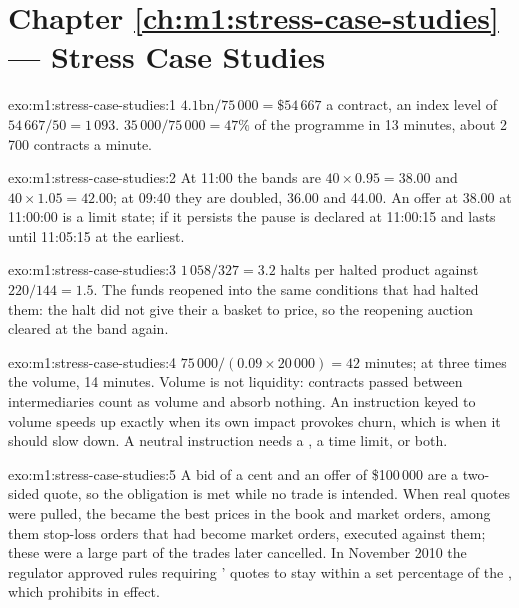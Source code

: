 \section*{Chapter \ref{ch:m1:stress-case-studies} --- Stress Case Studies}

\begin{solution}{exo:m1:stress-case-studies:1}
$4.1\text{bn}/75\,000 = \$54\,667$ a contract, an index level of $54\,667/50 =
1\,093$. $35\,000/75\,000 = 47\%$ of the programme in 13 minutes, about 2\,700
contracts a minute.
\end{solution}

\begin{solution}{exo:m1:stress-case-studies:2}
At 11:00 the bands are $40 \times 0.95 = 38.00$ and $40 \times 1.05 = 42.00$; at
09:40 they are doubled, 36.00 and 44.00. An offer at 38.00 at 11:00:00 is a
limit state; if it persists the pause is declared at 11:00:15 and lasts until
11:05:15 at the earliest.
\end{solution}

\begin{solution}{exo:m1:stress-case-studies:3}
$1\,058/327 = 3.2$ halts per halted product against $220/144 = 1.5$. The funds
reopened into the same conditions that had halted them: the halt did not give
their  a basket to price, so the reopening auction cleared at
the band again.
\end{solution}

\begin{solution}{exo:m1:stress-case-studies:4}
$75\,000/(0.09 \times 20\,000) = 42$ minutes; at three times the volume, 14
minutes. Volume is not liquidity: contracts passed between intermediaries
count as volume and absorb nothing. An instruction keyed to volume speeds up
exactly when its own impact provokes churn, which is when it should slow
down. A neutral instruction needs a , a time limit, or both.
\end{solution}

\begin{solution}{exo:m1:stress-case-studies:5}
A bid of a cent and an offer of \$100\,000 are a two-sided quote, so the
obligation is met while no trade is intended. When real quotes were pulled,
the  became the best prices in the book and market orders, among
them stop-loss orders that had become market orders, executed against them;
these were a large part of the trades later cancelled. In November 2010 the
regulator approved rules requiring ' quotes to stay within a set
percentage of the , which prohibits  in
effect.
\end{solution}

